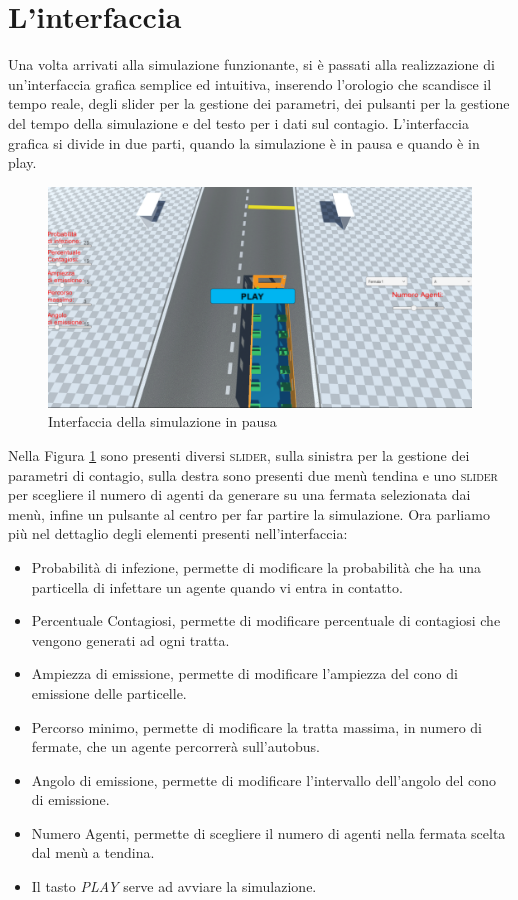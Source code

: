 \documentclass[12pt, openany]{book}
\begin{document}
	\section{L'interfaccia}
Una volta arrivati alla simulazione funzionante, si è passati alla realizzazione di un'interfaccia grafica semplice ed intuitiva, inserendo l'orologio che scandisce il tempo reale, degli slider per la gestione dei parametri, dei pulsanti per la gestione del tempo della simulazione e del testo per i dati sul contagio. L'interfaccia grafica si divide in due parti, quando la simulazione è in pausa e quando è in play.
\begin{figure}[H]
	\centering
	\includegraphics[width=0.8\linewidth]{"Immagini/PausedGui.png"}
	\caption{Interfaccia della simulazione in pausa}
	\label{fig:InterfacciaPausa}
\end{figure}
Nella Figura \ref{fig:InterfacciaPausa} sono presenti diversi \textsc{slider}, sulla sinistra per la gestione dei parametri di contagio, sulla destra sono presenti due menù tendina e uno \textsc{slider} per scegliere il numero di agenti da generare su una fermata selezionata dai menù, infine un pulsante al centro per far partire la simulazione.
Ora parliamo più nel dettaglio degli elementi presenti nell'interfaccia:\\
\begin{itemize}
	\item Probabilità di infezione, permette di modificare la probabilità che ha una particella di infettare un agente quando vi entra in contatto.
	\item Percentuale Contagiosi, permette di modificare percentuale di contagiosi che vengono generati ad ogni tratta.
	\item Ampiezza di emissione, permette di modificare l'ampiezza del cono di emissione delle particelle.
	\item Percorso minimo, permette di modificare la tratta massima, in numero di fermate, che un agente percorrerà sull'autobus.
	\item Angolo di emissione, permette di modificare l'intervallo dell'angolo del cono di emissione.
	\item Numero Agenti, permette di scegliere il numero di agenti nella fermata scelta dal menù a tendina.
	\item Il tasto \emph{PLAY} serve ad avviare la simulazione.
\end{itemize}
\end{document}
